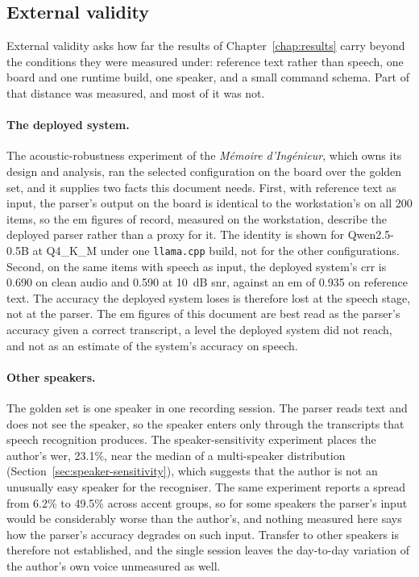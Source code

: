 \clearpage
\subsection{External validity}
\label{sec:threats-external}
External validity asks how far the results of Chapter~\ref{chap:results} carry beyond the
conditions they were measured under: reference text rather than speech, one board and one runtime
build, one speaker, and a small command schema. Part of that distance was measured, and most of it
was not.

\paragraph{The deployed system.} The acoustic-robustness experiment of the \emph{M\'emoire
d'Ing\'enieur}, which owns its design and analysis, ran the selected configuration on the board over
the golden set, and it supplies two facts this document needs. First, with reference text as input,
the parser's output on the board is identical to the workstation's on all 200 items, so the
\gls{em} figures of record, measured on the workstation, describe the deployed parser rather than a
proxy for it. The identity is shown for Qwen2.5-0.5B at Q4\_K\_M under one \texttt{llama.cpp} build,
not for the other configurations. Second, on the same items with speech as input, the deployed
system's \gls{crr} is 0.690 on clean audio and 0.590 at 10~dB \gls{snr}, against an \gls{em} of
0.935 on reference text. The accuracy the deployed system loses is therefore lost at the speech
stage, not at the parser. The \gls{em} figures of this document are best read as the parser's
accuracy given a correct transcript, a level the deployed system did not reach, and not as an
estimate of the system's accuracy on speech.

\paragraph{Other speakers.} The golden set is one speaker in one recording session. The parser
reads text and does not see the speaker, so the speaker enters only through the transcripts that
speech recognition produces. The speaker-sensitivity experiment places the author's \gls{wer}, 23.1\%,
near the median of a multi-speaker distribution (Section~\ref{sec:speaker-sensitivity}), which
suggests that the author is not an unusually easy speaker for the recogniser. The same experiment
reports a spread from 6.2\% to 49.5\% across accent groups, so for some speakers the parser's input
would be considerably worse than the author's, and nothing measured here says how the parser's
accuracy degrades on such input. Transfer to other speakers is therefore not established, and the
single session leaves the day-to-day variation of the author's own voice unmeasured as well.

